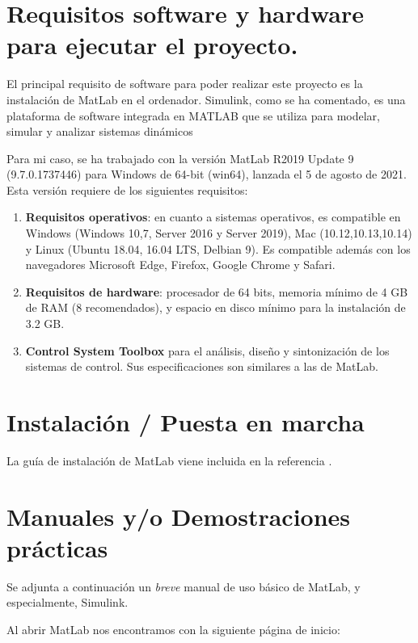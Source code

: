
\section{Requisitos software y hardware para ejecutar el proyecto.}

El principal requisito de software para poder realizar este proyecto es la instalación de MatLab en el ordenador. Simulink, como se ha comentado, es una plataforma de software integrada en MATLAB que se utiliza para modelar, simular y analizar sistemas dinámicos

Para mi caso, se ha trabajado con la versión MatLab R2019 Update 9 (9.7.0.1737446) para Windows de 64-bit (win64), lanzada el 5 de agosto de 2021. Esta versión requiere de los siguientes requisitos:
\begin{enumerate}
    \item \textbf{Requisitos operativos}: en cuanto a sistemas operativos, es compatible en Windows (Windows 10,7, Server 2016 y Server 2019), Mac (10.12,10.13,10.14) y Linux (Ubuntu 18.04, 16.04 LTS, Delbian 9). Es compatible además con los navegadores Microsoft Edge, Firefox, Google Chrome y Safari.
    \item \textbf{Requisitos de hardware}: procesador de 64 bits, memoria mínimo de 4 GB de RAM (8 recomendados), y espacio en disco mínimo para la instalación de 3.2 GB.
    \item \textbf{Control System Toolbox }para el análisis, diseño y sintonización de los sistemas de control. Sus especificaciones son similares a las de MatLab.
\end{enumerate}


\section{Instalación / Puesta en marcha}

La guía de instalación de MatLab viene incluida en la referencia \cite{mathworks2019}.

\section{Manuales y/o Demostraciones prácticas}

Se adjunta a continuación un \textit{breve} manual de uso básico de MatLab, y especialmente, Simulink.

Al abrir MatLab nos encontramos con la siguiente página de inicio:

